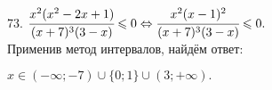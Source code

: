 73. $\cfrac{x^2(x^2-2x+1)}{(x+7)^3(3-x)}\leqslant0\Leftrightarrow\cfrac{x^2(x-1)^2}{(x+7)^3(3-x)}\leqslant0.$\\ Применив метод интервалов, найдём ответ:
\begin{figure}[ht!]
\end{figure}
$x\in(-\infty;-7)\cup\{0;1\}\cup(3;+\infty).$\\
